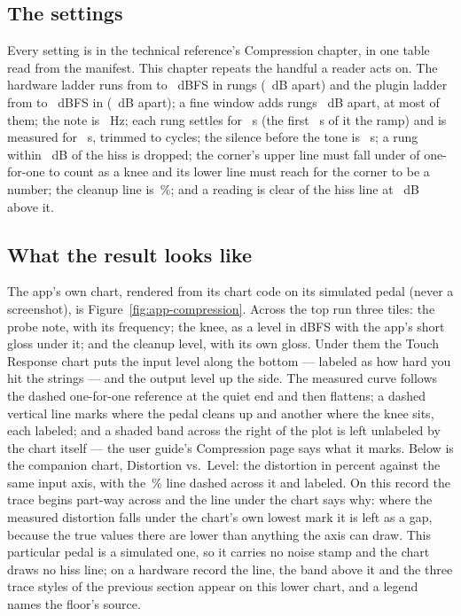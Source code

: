 \documentclass[11pt,a4paper]{article}
\begin{document}
\subsection{The settings}

Every setting is in the technical reference's Compression chapter, in one
table read from the manifest. This chapter repeats the handful a reader
acts on. The hardware ladder runs from \cmpHardwareFloorDBFS{} to
\cmpHardwareCeilingDBFS{}~dBFS in \cmpHardwareSteps{} rungs
(\cmpHardwareStepDB{}~dB apart) and the plugin ladder from
\cmpPluginFloorDBFS{} to \cmpPluginCeilingDBFS{}~dBFS in
\cmpPluginSteps{} (\cmpPluginStepDB{}~dB apart); a fine window adds rungs
\cmpFineStepDB{}~dB apart, at most \cmpFineCap{} of them; the note is
\cmpNoteHz{}~Hz; each rung settles for \cmpSettleS{}~s (the first
\cmpRampS{}~s of it the ramp) and is measured for \cmpMeasureS{}~s,
trimmed to \cmpMeasureCycles{} cycles; the silence before the tone is
\cmpPrerollS{}~s; a rung within \cmpGateDB{}~dB of the hiss is dropped;
the corner's upper line must fall under \cmpSlopeThreshold{} of
one-for-one to count as a knee and its lower line must reach
\cmpUnityGuardSlope{} for the corner to be a number; the cleanup line is
\cmpCleanupThresholdPercent{}\,\%; and a reading is clear of the hiss
line at \cmpClearMarginDB{}~dB above it.

\subsection{What the result looks like}

The app's own chart, rendered from its chart code on its simulated pedal
(never a screenshot), is Figure~\ref{fig:app-compression}. Across the top
run three tiles: the probe note, with its frequency; the knee, as a level
in dBFS with the app's short gloss under it; and the cleanup level, with
its own gloss. Under them the Touch Response chart puts the input level
along the bottom --- labeled as how hard you hit the strings --- and the
output level up the side. The measured curve follows the dashed
one-for-one reference at the quiet end and then flattens; a dashed
vertical line marks where the pedal cleans up and another where the knee
sits, each labeled; and a shaded band across the right of the plot is
left unlabeled by the chart itself --- the user guide's Compression page
says what it marks. Below is the companion chart, Distortion vs.\ Level:
the distortion in percent against the same input axis, with the
\cmpCleanupThresholdPercent{}\,\% line dashed across it and labeled. On this record the trace
begins part-way across and the line under the chart says why: where the
measured distortion falls under the chart's own lowest mark it is left as
a gap, because the true values there are lower than anything the axis can
draw. This particular pedal is a simulated one, so it carries no noise
stamp and the chart draws no hiss line; on a hardware record the line,
the band above it and the three trace styles of the previous section
appear on this lower chart, and a legend names the floor's source.
\end{document}
